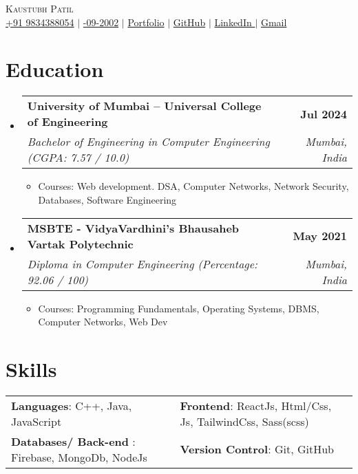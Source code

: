 \documentclass[letterpaper,11pt]{article}
\makeatletter
\newcommand{\resumeItem}[1]{
  \item\small{
    {#1 \vspace{-1pt}}
  }
}
\newcommand{\resumeSubheading}[4]{
  \vspace{-2pt}\item
    \begin{tabular*}{1.0\textwidth}[t]{l@{\extracolsep{\fill}}r}
      \vspace{-2pt}\textbf{#1} & \textbf{\small #2} \\
      \textit{\small#3} & \textit{\small #4} \\
    \end{tabular*}\vspace{-7pt}
}
\newcommand{\resumeSubHeadingListStart}{\begin{itemize}[leftmargin=0.0in, label={}]}
\newcommand{\resumeSubHeadingListEnd}{\end{itemize}}
\newcommand{\resumeItemListStart}{\begin{itemize}}
\newcommand{\resumeItemListEnd}{\end{itemize}\vspace{-5pt}}
\makeatother
\begin{document}
\begin{center}
 {\huge \scshape Kaustubh Patil} \\ \vspace{5pt}
    \small
    \href{tel:+919834388054}{\faPhone \space +91 9834388054} $|$
    \href{}{\faCalendar {}-09-2002} $|$
    \href{https://kaustubhpatil.vercel.app/}{\faGlobe \space Portfolio} $|$
    \href{https://github.com/KaustubhPatil02}{\faGithub \space GitHub} $|$
    \href{https://www.linkedin.com/in/kaustubhpatil02/}{\faLinkedin \space LinkedIn } $|$
    \href{mailto:kaustubhpatil880@gmail.com}{\faEnvelope \space Gmail} 
    
    \vspace{-10pt}
\end{center}


\section{Education}
    \resumeSubHeadingListStart
        \resumeSubheading
            {University of Mumbai --  Universal College of Engineering}{Jul 2024}
            {Bachelor of Engineering in Computer Engineering  (CGPA: 7.57  / 10.0)}{Mumbai, India}
            \resumeItemListStart
                \resumeItem{Courses:  Web development. DSA, Computer Networks, Network Security, Databases, Software Engineering}
            \resumeItemListEnd

        \resumeSubheading
            {MSBTE - VidyaVardhini’s Bhausaheb Vartak Polytechnic}{May 2021}
            {Diploma in Computer Engineering (Percentage: 92.06 / 100)}{Mumbai, India}
            \resumeItemListStart
                \resumeItem{Courses:  Programming Fundamentals, Operating Systems, DBMS, Computer Networks, Web Dev
                }
            \resumeItemListEnd
    \resumeSubHeadingListEnd
\vspace{-19pt}


\section{Skills}
    \vspace{-5pt}
    \begin{itemize}[leftmargin=0.2in, label={}]
        {\item{
            \begin{tabular}{ l@{\hskip 0.2in} l }
                 \textbf{Languages}: C++, Java, JavaScript  & 
                 \textbf{Frontend}: ReactJs, Html/Css, Js, TailwindCss, Sass(scss)  \\ \textbf{Databases/ Back-end }: Firebase, MongoDb,                 NodeJs &
                 \textbf{Version Control}: Git, GitHub \\
            \end{tabular}
        }}
    \end{itemize}
\vspace{-20pt}
\end{document}
